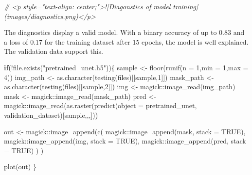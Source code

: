 \documentclass[
]{article}
\newenvironment{Shaded}{\begin{snugshade}}{\end{snugshade}}
\newcommand{\AttributeTok}[1]{\textcolor[rgb]{0.77,0.63,0.00}{#1}}
\newcommand{\CommentTok}[1]{\textcolor[rgb]{0.56,0.35,0.01}{\textit{#1}}}
\newcommand{\ConstantTok}[1]{\textcolor[rgb]{0.00,0.00,0.00}{#1}}
\newcommand{\ControlFlowTok}[1]{\textcolor[rgb]{0.13,0.29,0.53}{\textbf{#1}}}
\newcommand{\DecValTok}[1]{\textcolor[rgb]{0.00,0.00,0.81}{#1}}
\newcommand{\FunctionTok}[1]{\textcolor[rgb]{0.00,0.00,0.00}{#1}}
\newcommand{\NormalTok}[1]{#1}
\newcommand{\OtherTok}[1]{\textcolor[rgb]{0.56,0.35,0.01}{#1}}
\newcommand{\SpecialCharTok}[1]{\textcolor[rgb]{0.00,0.00,0.00}{#1}}
\newcommand{\StringTok}[1]{\textcolor[rgb]{0.31,0.60,0.02}{#1}}
\begin{document}
\begin{Shaded}
\begin{Highlighting}[]
\CommentTok{\# \textless{}p style="text{-}align: center;"\textgreater{}![Diagonstics of model training](images/diagnostics.png)\textless{}/p\textgreater{}}
\end{Highlighting}
\end{Shaded}

The diagnostics display a valid model. With a binary accuracy of up to
0.83 and a loss of 0.17 for the training dataset after 15 epochs, the
model is well explained. The validation data support this.

\begin{Shaded}
\begin{Highlighting}[]
\ControlFlowTok{if}\NormalTok{(}\SpecialCharTok{!}\FunctionTok{file.exists}\NormalTok{(}\StringTok{"pretrained\_unet.h5"}\NormalTok{))\{}
\NormalTok{  sample }\OtherTok{\textless{}{-}} \FunctionTok{floor}\NormalTok{(}\FunctionTok{runif}\NormalTok{(}\AttributeTok{n =} \DecValTok{1}\NormalTok{,}\AttributeTok{min =} \DecValTok{1}\NormalTok{,}\AttributeTok{max =} \DecValTok{4}\NormalTok{))}
\NormalTok{    img\_path }\OtherTok{\textless{}{-}} \FunctionTok{as.character}\NormalTok{(}\FunctionTok{testing}\NormalTok{(files)[[sample,}\DecValTok{1}\NormalTok{]])}
\NormalTok{    mask\_path }\OtherTok{\textless{}{-}} \FunctionTok{as.character}\NormalTok{(}\FunctionTok{testing}\NormalTok{(files)[[sample,}\DecValTok{2}\NormalTok{]])}
\NormalTok{    img }\OtherTok{\textless{}{-}}\NormalTok{ magick}\SpecialCharTok{::}\FunctionTok{image\_read}\NormalTok{(img\_path)}
\NormalTok{    mask }\OtherTok{\textless{}{-}}\NormalTok{ magick}\SpecialCharTok{::}\FunctionTok{image\_read}\NormalTok{(mask\_path)}
\NormalTok{    pred }\OtherTok{\textless{}{-}}\NormalTok{ magick}\SpecialCharTok{::}\FunctionTok{image\_read}\NormalTok{(}\FunctionTok{as.raster}\NormalTok{(}\FunctionTok{predict}\NormalTok{(}\AttributeTok{object =}\NormalTok{ pretrained\_unet,}
\NormalTok{                                                 validation\_dataset)[sample,,,]))}
  
\NormalTok{    out }\OtherTok{\textless{}{-}}\NormalTok{ magick}\SpecialCharTok{::}\FunctionTok{image\_append}\NormalTok{(}\FunctionTok{c}\NormalTok{(}
\NormalTok{    magick}\SpecialCharTok{::}\FunctionTok{image\_append}\NormalTok{(mask, }\AttributeTok{stack =} \ConstantTok{TRUE}\NormalTok{),}
\NormalTok{    magick}\SpecialCharTok{::}\FunctionTok{image\_append}\NormalTok{(img, }\AttributeTok{stack =} \ConstantTok{TRUE}\NormalTok{),}
\NormalTok{    magick}\SpecialCharTok{::}\FunctionTok{image\_append}\NormalTok{(pred, }\AttributeTok{stack =} \ConstantTok{TRUE}\NormalTok{)}
\NormalTok{  )}
\NormalTok{  )}
  
  \FunctionTok{plot}\NormalTok{(out)}
\NormalTok{\}}
\end{Highlighting}
\end{Shaded}
\end{document}
